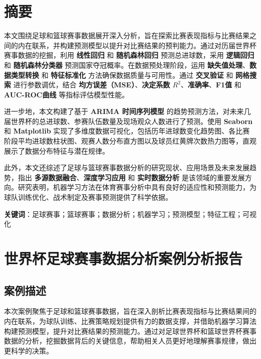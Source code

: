 \documentclass[UTF8]{ctexart}
\author{}
\date{}
\author{}
\date{}
\begin{document}
\section*{摘要}
本文围绕足球和篮球赛事数据展开深入分析，旨在探索比赛表现指标与比赛结果之间的内在联系，并构建预测模型以提升对比赛结果的预判能力。通过对历届世界杯赛事数据的挖掘，利用 \textbf{线性回归} 和 \textbf{随机森林回归} 预测总进球数，采用 \textbf{逻辑回归} 和 \textbf{随机森林分类器} 预测国家夺冠概率。在数据预处理阶段，运用 \textbf{缺失值处理}、\textbf{数据类型转换} 和 \textbf{特征标准化} 方法确保数据质量与可用性。通过 \textbf{交叉验证} 和 \textbf{网格搜索} 进行参数调优，结合 \textbf{均方误差（MSE）}、\textbf{决定系数 $R^2$}、\textbf{准确率}、\textbf{F1值} 和 \textbf{AUC-ROC曲线} 等指标评估模型性能。

进一步地，本文构建了基于 \textbf{ARIMA 时间序列模型} 的趋势预测方法，对未来几届世界杯的总进球数、参赛队伍数量及现场观众人数进行了预测。使用 \textbf{Seaborn} 和 \textbf{Matplotlib} 实现了多维度数据可视化，包括历年进球数变化趋势图、各比赛阶段平均进球数柱状图、观赛人数分布直方图以及球员红黄牌次数热力图等，直观展示了数据分布特征与潜在规律。

此外，本文还综述了足球与篮球赛事数据分析的研究现状、应用场景及未来发展趋势，指出 \textbf{多源数据融合}、\textbf{深度学习应用} 和 \textbf{实时数据分析} 是该领域的重要发展方向。研究表明，机器学习方法在体育赛事分析中具有良好的适应性和预测能力，为球队训练优化、战术制定及赛事预测提供了科学依据。

\textbf{关键词}：足球赛事；篮球赛事；数据分析；机器学习；预测模型；特征工程；可视化
\newpage

\tableofcontents

\newpage

\section{世界杯足球赛事数据分析案例分析报告}

\subsection{案例描述}
本次案例聚焦于足球和篮球赛事数据，旨在深入剖析比赛表现指标与比赛结果间的内在联系，为球队训练、比赛策略规划提供有力的数据支撑，并借助机器学习算法构建预测模型，提升对比赛结果的预测能力。通过对足球世界杯和篮球世界杯赛事数据的分析，挖掘数据背后的关键信息，帮助相关人员更好地理解赛事规律，做出更科学的决策。
\end{document}
